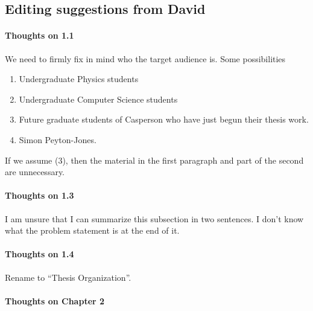 \begin{scope}
\begin{enumerate}
\end{enumerate}

\subsection{Editing suggestions from David}\label{sec:edit-sugg-david}

\paragraph{Thoughts on 1.1}

We need to firmly fix in mind who the target audience is.  Some
possibilities
\begin{enumerate}
\item Undergraduate Physics students
\item Undergraduate Computer Science students
\item
  Future graduate students of Casperson who have just begun their
  thesis work.
\item
  Simon Peyton-Jones.
\end{enumerate}
If we assume (3), then the material in the first paragraph and part of
the second are unnecessary.

\paragraph{Thoughts on 1.3}

I am unsure that I can summarize this subsection in two sentences.  I
don't know what the problem statement is at the end of it.

\paragraph{Thoughts on 1.4}

Rename to ``Thesis Organization''.

\paragraph{Thoughts on Chapter 2}


\end{scope}
